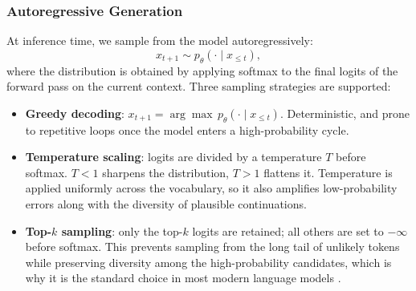 \subsubsection{Autoregressive Generation}
At inference time, we sample from the model autoregressively:
\begin{equation}
x_{t+1} \sim p_\theta(\cdot \mid x_{\leq t}),
\label{eq:ar}
\end{equation}
where the distribution is obtained by applying softmax to the final logits
of the forward pass on the current context. Three sampling strategies are
supported:
\begin{itemize}
    \item \textbf{Greedy decoding}: $x_{t+1} = \arg\max\, p_\theta(\cdot \mid x_{\leq t})$.
          Deterministic, and prone to repetitive loops once the model
          enters a high-probability cycle.
    \item \textbf{Temperature scaling}: logits are divided by a temperature
          $T$ before softmax. $T < 1$ sharpens the distribution,
          $T > 1$ flattens it. Temperature is applied uniformly across
          the vocabulary, so it also amplifies low-probability errors
          along with the diversity of plausible continuations.
    \item \textbf{Top-$k$ sampling}: only the top-$k$ logits are retained;
          all others are set to $-\infty$ before softmax. This prevents
          sampling from the long tail of unlikely tokens while preserving
          diversity among the high-probability candidates, which is why
          it is the standard choice in most modern language models
          \parencite{holtzman2020curious}.
\end{itemize}